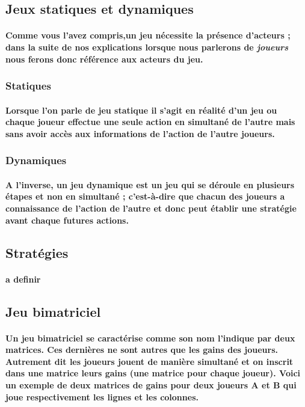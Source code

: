 \documentclass[a4paper, 12pt, twoside]{article}
\begin{document}
\subsection{Jeux statiques et dynamiques}
\paragraph{Comme vous l'avez compris,un jeu nécessite la présence d'acteurs ; dans la suite de nos explications lorsque nous parlerons de \textit{joueurs} nous ferons donc référence aux acteurs du jeu.}
\subsubsection{Statiques}
\paragraph{Lorsque l'on parle de jeu statique il s'agit en réalité d'un jeu ou chaque joueur effectue une seule action en simultané de l'autre mais sans avoir accès aux informations de l'action de l'autre joueurs.}
\subsubsection{Dynamiques}
\paragraph{A l'inverse, un jeu dynamique est un jeu qui se déroule en plusieurs étapes et non en simultané ; c'est-à-dire que chacun des joueurs a connaissance de l'action de l'autre et donc peut établir une stratégie avant chaque futures actions.  }
\subsection{Stratégies}
\paragraph{a definir}
\subsection{Jeu bimatriciel}
\paragraph{Un jeu bimatriciel se caractérise comme son nom l'indique par deux matrices. Ces dernières ne sont autres que les gains des joueurs. Autrement dit les joueurs jouent de manière simultané et on inscrit dans une matrice leurs gains (une matrice pour chaque joueur). Voici un exemple de deux matrices de gains pour deux joueurs A et B qui joue respectivement les lignes et les colonnes.}
\end{document}
